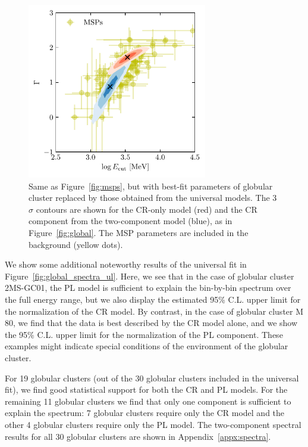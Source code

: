 \documentclass[doublespace,nopageskip]{VTthesis}
\begin{document}
\begin{figure}[htb]
    \centering
    \includegraphics[width=0.7\textwidth]{Figures/Globular/msp_vs_gc_global.pdf}
    \caption{Same as Figure~\ref{fig:msps}, but with best-fit parameters of globular cluster replaced by those obtained from the universal models. The 3$\sigma$ contours are shown for the CR-only model (red) and the CR component from the two-component model (blue), as in Figure~\ref{fig:global}. The MSP parameters are included in the background (yellow dots).}
    \label{fig:msps_global}
\end{figure}

We show some additional noteworthy results of the universal fit in Figure~\ref{fig:global_spectra_ul}. Here, we see that in the case of globular cluster 2MS-GC01, the {PL} model is sufficient to explain the bin-by-bin spectrum over the full energy range, but we also display the estimated 95\% C.L. upper limit for the normalization of the CR model. By contrast, in the case of globular cluster M 80, we find that the data is best described by the CR model alone, and we show the 95\% C.L. upper limit for the normalization of the {PL} component. These examples might indicate special conditions of the environment of the globular cluster.

For 19 globular clusters (out of the 30 globular clusters included in the universal fit), we find good statistical support for both the CR and {PL} models. For the remaining 11 globular clusters we find that only one component is sufficient to explain the spectrum: 7 globular clusters require only the CR model and the other 4 globular clusters require only the {PL} model. The two-component spectral results for all 30 globular clusters are shown in Appendix~\ref{appx:spectra}.
\end{document}
